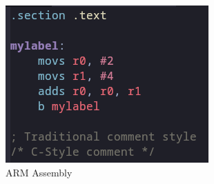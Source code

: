 \documentclass{beamer}
\begin{document}
\begin{frame}
\begin{columns}
\begin{column}{0.4\textwidth}
			\begin{figure}
				\centering
				\includegraphics[width=\textwidth]{images/assembly.png}
				\caption{\small ARM Assembly}
			\end{figure}
        \end{column}
    \end{columns}
\end{frame}
\end{document}
